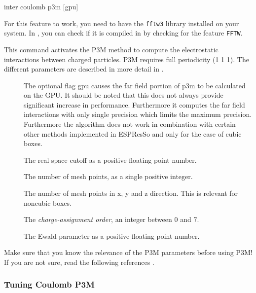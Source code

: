 \begin{essyntax}
  inter coulomb  p3m [gpu] 
     
  \begin{features}
  \end{features}
\end{essyntax}

For this feature to work, you need to have the \texttt{fftw3} library
installed on your system. In \es{}, you can check if it is compiled in
by checking for the feature \texttt{FFTW}.

This command activates the P3M method to compute the electrostatic
interactions between charged particles. P3M requires full periodicity (1 1 1).  The different parameters are
described in more detail in \cite{deserno98a}.
\begin{description}
\item[\var{[gpu]}]
The optional flag gpu causes the far field portion of p3m to be calculated on the GPU.  It should be noted that this does not always provide significant increase in performance.  Furthermore it computes the far field interactions with only single precision which limits the maximum precision.  Furthermore the algorithm does not work in combination with certain other methods implemented in ESPResSo and only for the case of cubic boxes.
\item[] The real space cutoff as a positive
  floating point number.
\item[] The number of mesh points, as a single positive
  integer.
\item[] The number of mesh points in x, y and z
  direction. This is relevant for noncubic boxes.
\item[] The \emph{charge-assignment order}, an integer
  between $0$ and $7$.
\item[] The Ewald parameter as a positive floating point
  number.
\end{description}

Make sure that you know the relevance of the P3M parameters before
using P3M! If you are not sure, read the following references
\cite{ewald21, hockney88, kolafa92, deserno98, deserno98a, deserno00,
  deserno00a, cerda08a}.


\subsubsection{Tuning Coulomb P3M}
\label{ssec:tunep3m}

